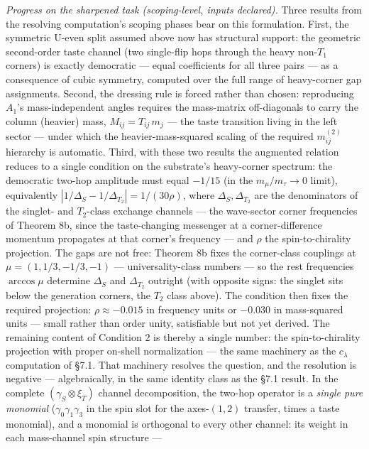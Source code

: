 \documentclass[
]{article}
\begin{document}
\emph{Progress on the sharpened task (scoping-level, inputs declared).}
Three results from the resolving computation's scoping phases bear on
this formulation. First, the symmetric U-even split assumed above now
has structural support: the geometric second-order taste channel (two
single-flip hops through the heavy non-\(T_1\) corners) is exactly
democratic --- equal coefficients for all three pairs --- as a
consequence of cubic symmetry, computed over the full range of
heavy-corner gap assignments. Second, the dressing rule is forced rather
than chosen: reproducing \(A_1\)'s mass-independent angles requires the
mass-matrix off-diagonals to carry the column (heavier) mass,
\(M_{ij} = T_{ij}\, m_j\) --- the taste transition living in the left
sector --- under which the heavier-mass-squared scaling of the required
\(m^{(2)}_{ij}\) hierarchy is automatic. Third, with these two results
the augmented relation reduces to a single condition on the substrate's
heavy-corner spectrum: the democratic two-hop amplitude must equal
\(-1/15\) (in the \(m_\mu/m_\tau \to 0\) limit), equivalently
\(|1/\Delta_S - 1/\Delta_{T_2}| = 1/(30\rho)\), where
\(\Delta_S, \Delta_{T_2}\) are the denominators of the singlet- and
\(T_2\)-class exchange channels --- the wave-sector corner frequencies
of Theorem 8b, since the taste-changing messenger at a corner-difference
momentum propagates at that corner's frequency --- and \(\rho\) the
spin-to-chirality projection. The gaps are not free: Theorem 8b fixes
the corner-class couplings at \(\mu = (1, 1/3, -1/3, -1)\) ---
universality-class numbers --- so the rest frequencies \(\arccos\mu\)
determine \(\Delta_S\) and \(\Delta_{T_2}\) outright (with opposite
signs: the singlet sits below the generation corners, the \(T_2\) class
above). The condition then fixes the required projection:
\(\rho \approx -0.015\) in frequency units or \(-0.030\) in mass-squared
units --- small rather than order unity, satisfiable but not yet
derived. The remaining content of Condition 2 is thereby a single
number: the spin-to-chirality projection with proper on-shell
normalization --- the same machinery as the \(c_\lambda\) computation of
§7.1. That machinery resolves the question, and the resolution is
negative --- algebraically, in the same identity class as the §7.1
result. In the complete \((\gamma_S \otimes \xi_T)\) channel
decomposition, the two-hop operator is a \emph{single pure monomial}
(\(\gamma_0\gamma_1\gamma_3\) in the spin slot for the axes-\((1,2)\)
transfer, times a taste monomial), and a monomial is orthogonal to every
other channel: its weight in each mass-channel spin structure ---
\end{document}
